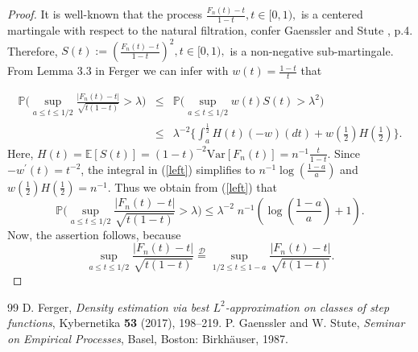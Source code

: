 \documentclass[10pt,a4paper]{amsart}
\begin{document}
\begin{proof} It is well-known that the process $\frac{F_n(t)-t}{1-t}, t \in [0,1),$ is a centered martingale with respect to the natural filtration, confer Gaenssler and Stute \cite{Gaenssler}, p.4. Therefore, $S(t):= (\frac{F_n(t)-t}{1-t})^2, t \in [0,1),$ is a non-negative sub-martingale.
From Lemma 3.3 in Ferger \cite{Ferger1} we can infer with $w(t)=\frac{1-t}{t}$ that

\begin{eqnarray}
\mathbb{P}\big(\sup_{a \le t \le 1/2} \frac{|F_n(t)-t|}{\sqrt{t(1-t)}} > \lambda \big)
&\le&\mathbb{P}\big(\sup_{a \le t \le 1/2} w(t) S(t) > \lambda^2 \big) \nonumber\\
&\le& \lambda^{-2}\{\int_a^{\frac{1}{2}} H(t) (-w)(dt)+w(\frac{1}{2}) H(\frac{1}{2})\}. \label{left}
\end{eqnarray}
Here, $H(t)=\mathbb{E}[S(t)]= (1-t)^{-2} \text{Var}[F_n(t)]= n^{-1} \frac{t}{1-t}.$ Since $-w^\prime(t)=t^{-2}$, the integral in (\ref{left}) simplifies to
$n^{-1} \log(\frac{1-a}{a})$ and $w(\frac{1}{2}) H(\frac{1}{2})=n^{-1}$. Thus we obtain from (\ref{left}) that
$$
 \mathbb{P}\big(\sup_{a \le t \le 1/2} \frac{|F_n(t)-t|}{\sqrt{t(1-t)}} > \lambda \big) \le \lambda^{-2} \; n^{-1} (\log(\frac{1-a}{a})+1).
$$
Now, the assertion follows, because $$\sup_{a \le t \le 1/2} \frac{|F_n(t)-t|}{\sqrt{t(1-t)}} \stackrel{\mathcal{D}}{=} \sup_{1/2 \le t \le 1-a} \frac{|F_n(t)-t|}{\sqrt{t(1-t)}}.$$
\end{proof}

\begin{thebibliography}{99}
 D. Ferger, \textit{Density estimation via best $L^2$-approximation on classes of step functions}, Kybernetika \textbf{53} (2017), 198--219.
 P. Gaenssler and W. Stute, \textit{Seminar on Empirical Processes}, Basel, Boston: Birkh\"{a}user, 1987.
\end{thebibliography}
\end{document}

